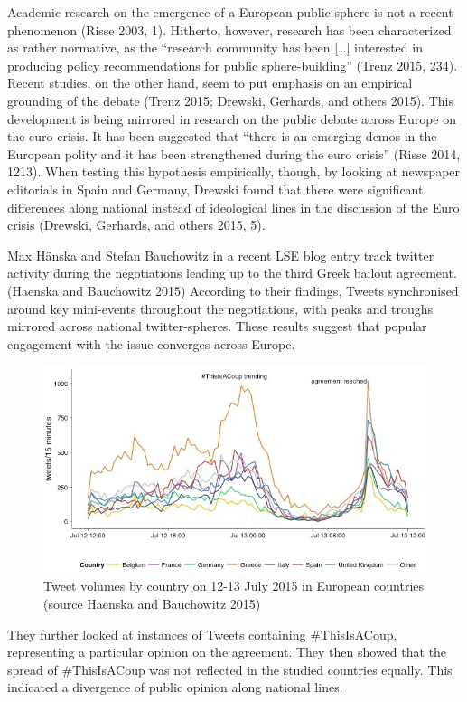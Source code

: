 \documentclass[]{article}
\begin{document}
Academic research on the emergence of a European public sphere is not a
recent phenomenon (Risse 2003, 1). Hitherto, however, research has been
characterized as rather normative, as the ``research community has been
{[}\ldots{}{]} interested in producing policy recommendations for public
sphere-building'' (Trenz 2015, 234). Recent studies, on the other hand,
seem to put emphasis on an empirical grounding of the debate (Trenz
2015; Drewski, Gerhards, and others 2015). This development is being
mirrored in research on the public debate across Europe on the euro
crisis. It has been suggested that ``there is an emerging demos in the
European polity and it has been strengthened during the euro crisis''
(Risse 2014, 1213). When testing this hypothesis empirically, though, by
looking at newspaper editorials in Spain and Germany, Drewski found that
there were significant differences along national instead of ideological
lines in the discussion of the Euro crisis (Drewski, Gerhards, and
others 2015, 5).

Max Hänska and Stefan Bauchowitz in a recent LSE blog entry track
twitter activity during the negotiations leading up to the third Greek
bailout agreement. (Haenska and Bauchowitz 2015) According to their
findings, Tweets synchronised around key mini-events throughout the
negotiations, with peaks and troughs mirrored across national
twitter-spheres. These results suggest that popular engagement with the
issue converges across Europe.

\begin{figure}[htbp]
\centering
\includegraphics{img/Greece-twitter-1.jpg}
\caption{Tweet volumes by country on 12-13 July 2015 in European
countries (source Haenska and Bauchowitz 2015)}
\end{figure}

They further looked at instances of Tweets containing \#ThisIsACoup,
representing a particular opinion on the agreement. They then showed
that the spread of \#ThisIsACoup was not reflected in the studied
countries equally. This indicated a divergence of public opinion along
national lines.
\end{document}
